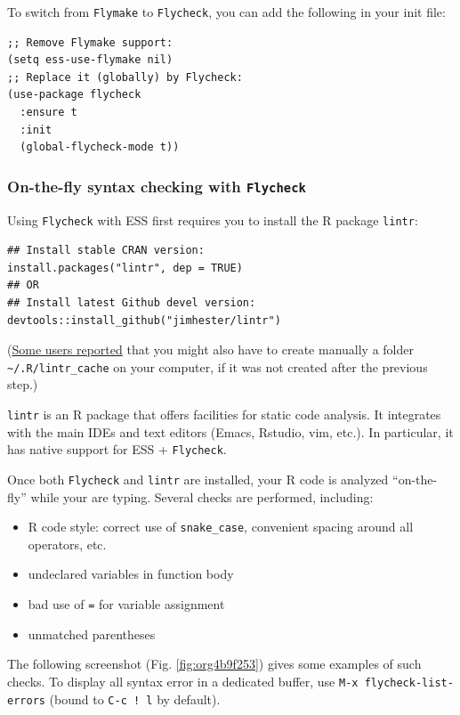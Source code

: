 \documentclass[11pt]{article}
\begin{document}
To switch from \texttt{Flymake} to \texttt{Flycheck}, you can add the following in your init file:

\begin{verbatim}
;; Remove Flymake support:
(setq ess-use-flymake nil)
;; Replace it (globally) by Flycheck:
(use-package flycheck
  :ensure t
  :init
  (global-flycheck-mode t))
\end{verbatim}

\subsubsection{On-the-fly syntax checking with \texttt{Flycheck}}
\label{sec:org41ed33e}
Using \texttt{Flycheck} with ESS first requires you to install the R package \texttt{lintr}:

\begin{verbatim}
## Install stable CRAN version:
install.packages("lintr", dep = TRUE)
## OR
## Install latest Github devel version:
devtools::install_github("jimhester/lintr")
\end{verbatim}

(\href{https://emacs.stackexchange.com/questions/53018/flycheck-r-lintr-doesnt-find-anything}{Some users reported} that you might also have to create manually a folder \texttt{\textasciitilde{}/.R/lintr\_cache} on your computer, if it was not created after the previous step.)

\texttt{lintr} is an R package that offers facilities for static code analysis. It integrates with the main IDEs and text editors (Emacs, Rstudio, vim, etc.). In particular, it has native support for ESS + \texttt{Flycheck}.

Once both \texttt{Flycheck} and \texttt{lintr} are installed, your R code is analyzed ``on-the-fly'' while your are typing. Several checks are performed, including:
\begin{itemize}
\item R code style: correct use of \texttt{snake\_case}, convenient spacing around all operators, etc.
\item undeclared variables in function body
\item bad use of \texttt{=} for variable assignment
\item unmatched parentheses
\end{itemize}

The following screenshot (Fig. \ref{fig:org4b9f253}) gives some examples of such checks. To display all syntax error in a dedicated buffer, use \texttt{M-x flycheck-list-errors} (bound to \texttt{C-c ! l} by default).
\end{document}
